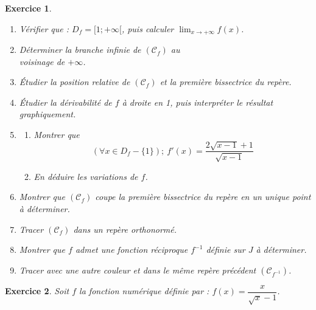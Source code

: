 \documentclass[12pt,a4paper]{article}
\newcommand{\Lim}{\displaystyle\lim}
\theoremstyle{mystyle}
\newtheorem{exo}{Exercice}
\begin{document}
\begin{multicols*}{2}
\begin{exo}
\begin{enumerate}
    \item Vérifier que : $D_f = [1; +\infty[$, puis calculer $\Lim_{x \to +\infty} f(x)$.
    \item Déterminer la branche infinie de $(\mathcal{C}_f)$ au \\voisinage de $+\infty$.
    \item Étudier la position relative de $(\mathcal{C}_f)$ et la première bissectrice du repère.
    \item Étudier la dérivabilité de $f$ à droite en 1, puis interpréter le résultat graphiquement.
    \item 
    \begin{enumerate}
        \item Montrer que $$(\forall x \in D_f-\{1\}); \ f'(x) = \frac{2\sqrt{x-1}+1}{\sqrt{x-1}}$$
        \item En déduire les variations de $f$.
    \end{enumerate}
    \item Montrer que $(\mathcal{C}_f)$ coupe la première bissectrice du repère en un unique point à déterminer.
    \item Tracer $(\mathcal{C}_f)$ dans un repère orthonormé.
    \item Montrer que $f$ admet une fonction réciproque $f^{-1}$ définie sur $J$ à déterminer.
    \item Tracer avec une autre couleur et dans le même repère précédent $(\mathcal{C}_{f^{-1}})$.
\end{enumerate}
\end{exo}

\begin{exo}

Soit $f$ la fonction numérique définie par : $f(x) = \dfrac{x}{\sqrt{x}-1}$.


\end{exo}
\end{multicols*}
\end{document}
